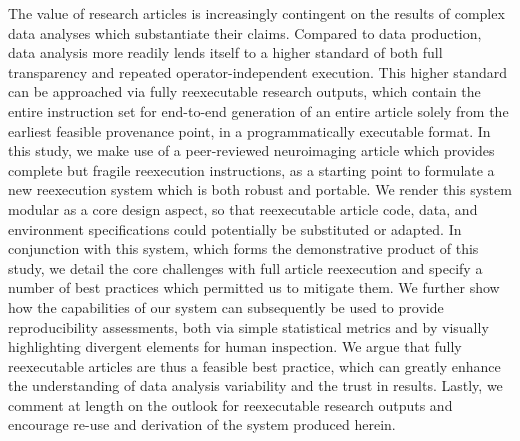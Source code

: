 The value of research articles is increasingly contingent on the results of complex data analyses which substantiate their claims.
Compared to data production, data analysis more readily lends itself to a higher standard of both full transparency and repeated operator-independent execution.
This higher standard can be approached via fully reexecutable research outputs, which contain the entire instruction set for end-to-end generation of an entire article solely from the earliest feasible provenance point, in a programmatically executable format.
In this study, we make use of a peer-reviewed neuroimaging article which provides complete but fragile reexecution instructions, as a starting point to formulate a new reexecution system which is both robust and portable.
We render this system modular as a core design aspect, so that reexecutable article code, data, and environment specifications could potentially be substituted or adapted.
In conjunction with this system, which forms the demonstrative product of this study, we detail the core challenges with full article reexecution and specify a number of best practices which permitted us to mitigate them.
We further show how the capabilities of our system can subsequently be used to provide reproducibility assessments, both via simple statistical metrics and by visually highlighting divergent elements for human inspection.
We argue that fully reexecutable articles are thus a feasible best practice, which can greatly enhance the understanding of data analysis variability and the trust in results.
Lastly, we comment at length on the outlook for reexecutable research outputs and encourage re-use and derivation of the system produced herein.

